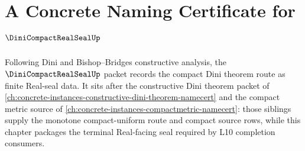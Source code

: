 \chapter{A Concrete Naming Certificate for $\DiniCompactRealSealUp$}
\label{ch:concrete-instances-dini-compact-real-seal-namecert}

Following Dini and Bishop--Bridges constructive analysis, the $\DiniCompactRealSealUp$ packet records the compact Dini theorem route as finite Real-seal data. It sits after the constructive Dini theorem packet of \autoref{ch:concrete-instances-constructive-dini-theorem-namecert} and the compact metric source of \autoref{ch:concrete-instances-compactmetric-namecert}: those siblings supply the monotone compact-uniform route and compact source rows, while this chapter packages the terminal Real-facing seal required by L10 completion consumers.

